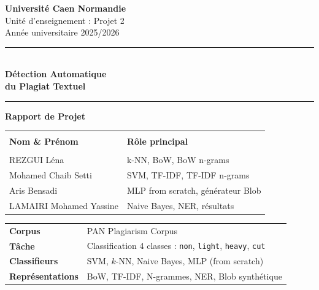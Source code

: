 \documentclass[12pt,a4paper]{article}
\begin{document}

\begin{titlepage}
\centering
\vspace*{1cm}

{\LARGE\bfseries Université Caen Normandie}\\[0.3cm]
{\large Unité d'enseignement : Projet 2}\\[0.2cm]
{\large Année universitaire 2025/2026}

\vspace{1cm}
\noindent\rule{\linewidth}{1.5pt}\\[0.5cm]

{\Huge\bfseries Détection Automatique\\[0.3cm] du Plagiat Textuel}\\[0.4cm]

\vspace{0.3cm}
\noindent\rule{\linewidth}{1.5pt}

\vspace{1.5cm}
{\large\bfseries Rapport de Projet}

\vspace{1.5cm}

\begin{tabular}{ll}
\hline\\[2pt]
\textbf{Nom \& Prénom} & \textbf{Rôle principal}\\[4pt]
\hline\\[2pt]
REZGUI Léna                 & k-NN, BoW, BoW n-grams\\[6pt]
Mohamed Chaib Setti         & SVM, TF-IDF, TF-IDF n-grams\\[6pt]
Aris Bensadi                & MLP from scratch, générateur Blob\\[6pt]
LAMAIRI Mohamed Yassine     & Naive Bayes, NER, résultats\\[4pt]
\hline
\end{tabular}

\vspace{2cm}

\begin{tabular}{ll}
\textbf{Corpus}          & PAN Plagiarism Corpus\\[4pt]
\textbf{Tâche}           & Classification 4 classes : \texttt{non}, \texttt{light}, \texttt{heavy}, \texttt{cut}\\[4pt]
\textbf{Classifieurs}    & SVM, $k$-NN, Naive Bayes, MLP (from scratch)\\[4pt]
\textbf{Représentations} & BoW, TF-IDF, N-grammes, NER, Blob synthétique\\
\end{tabular}

\vfill
\end{titlepage}
\end{document}

